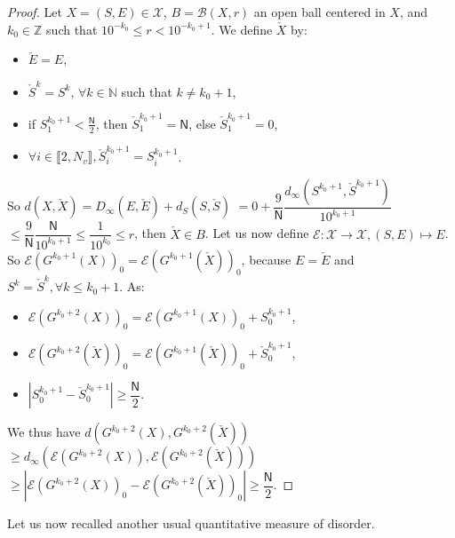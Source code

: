 \documentclass{llncs}
\begin{document}
\begin{proof}
Let $X = (S,E) \in \mathcal{X}$, $B = \mathcal{B}\left(X,r\right)$ an open ball centered in $X$, and $k_0 \in \mathds{Z}$ such that $10^{-k_0} \leqslant r < 10^{-k_0+1}$.
We define $\check{X}$ by:
\begin{itemize}
\item $\check{E} = E$,
\item $\check{S}^k = S^k$, $\forall k \in \mathds{N}$ such that $k \neq k_0+1$,
\item if $S_1^{k_0+1} < \frac{\mathsf{N}}{2}$, then $\check{S}_1^{k_0+1} = \mathsf{N}$, else $\check{S}_1^{k_0+1} = 0$,
\item $\forall i \in \llbracket 2, N_v \rrbracket, \check{S}_i^{k_0+1} = S_i^{k_0+1}$.
\end{itemize} 

So $d(X, \check{X}) = D_\infty (E,\check{E})+d_S(S,\check{S}) $ $= 0 + \dfrac{9}{\mathsf{N}} \dfrac{d_\infty (S^{k_0+1}, \check{S}^{k_0+1})}{10^{k_0+1}}$
$ \leqslant \dfrac{9}{\mathsf{N}} \dfrac{\mathsf{N}}{10^{k_0+1}} \leqslant \dfrac{1}{10^{k_0}} \leqslant r$, then $\check{X} \in B$. Let us now define $\mathcal{E} : \mathcal{X} \rightarrow \mathcal{X}, (S,E) \mapsto E$. So $\mathcal{E}\left(G^{k_0+1} (X) \right)_0 = \mathcal{E}\left(G^{k_0+1} (\check{X}) \right)_0$, because $E=\check{E}$ and $S^k = \check{S}^k, \forall k \leqslant k_0+1$. As:
\begin{itemize}
\item $\mathcal{E}\left(G^{k_0+2} (X) \right)_0 = \mathcal{E}\left(G^{k_0+1} (X) \right)_0 + S_0^{k_0+1}$,
\item $\mathcal{E}\left(G^{k_0+2} (\check{X}) \right)_0 = \mathcal{E}\left(G^{k_0+1} (\check{X}) \right)_0 + \check{S}_0^{k_0+1}$,
\item $\left| S_0^{k_0+1} - \check{S}_0^{k_0+1} \right| \geqslant \dfrac{\mathsf{N}}{2}$.
\end{itemize}

We thus have $d\left( G^{k_0+2}(X), G^{k_0+2}(\check{X}) \right)$ $\geqslant d_\infty \left(\mathcal{E}\left( G^{k_0+2}(X)\right), \mathcal{E}\left(G^{k_0+2}(\check{X})\right) \right)$
$\geqslant \left| \mathcal{E}\left( G^{k_0+2}(X)\right)_0 -  \mathcal{E}\left(G^{k_0+2}(\check{X})\right)_0\right| \geqslant \dfrac{\mathsf{N}}{2}$.
\end{proof}




Let us now recalled another usual quantitative measure of disorder.
\end{document}
